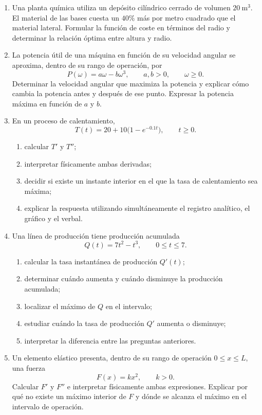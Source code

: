 \begin{enumerate}[label=\textbf{\arabic*.},leftmargin=*]
\item Una planta química utiliza un depósito cilíndrico cerrado de volumen $20\ \mathrm{m}^3$. El material de las bases cuesta un $40\%$ más por metro cuadrado que el material lateral. Formular la función de coste en términos del radio y determinar la relación óptima entre altura y radio.

\item La potencia útil de una máquina en función de su velocidad angular se aproxima, dentro de su rango de operación, por
\[
P(\omega)=a\omega-b\omega^3,
\qquad a,b>0,
\qquad \omega\geq0.
\]
Determinar la velocidad angular que maximiza la potencia y explicar cómo cambia la potencia antes y después de ese punto. Expresar la potencia máxima en función de $a$ y $b$.

\item En un proceso de calentamiento,
\[
T(t)=20+10\bigl(1-e^{-0.1t}\bigr),
\qquad t\geq0.
\]
\begin{enumerate}[label=\alph*)]
\item calcular $T'$ y $T''$;
\item interpretar físicamente ambas derivadas;
\item decidir si existe un instante interior en el que la tasa de calentamiento sea máxima;
\item explicar la respuesta utilizando simultáneamente el registro analítico, el gráfico y el verbal.
\end{enumerate}

\item Una línea de producción tiene producción acumulada
\[
Q(t)=7t^2-t^3,
\qquad 0\leq t\leq7.
\]
\begin{enumerate}[label=\alph*)]
\item calcular la tasa instantánea de producción $Q'(t)$;
\item determinar cuándo aumenta y cuándo disminuye la producción acumulada;
\item localizar el máximo de $Q$ en el intervalo;
\item estudiar cuándo la tasa de producción $Q'$ aumenta o disminuye;
\item interpretar la diferencia entre las preguntas anteriores.
\end{enumerate}

\item Un elemento elástico presenta, dentro de su rango de operación $0\leq x\leq L$, una fuerza
\[
F(x)=kx^2,
\qquad k>0.
\]
Calcular $F'$ y $F''$ e interpretar físicamente ambas expresiones. Explicar por qué no existe un máximo interior de $F$ y dónde se alcanza el máximo en el intervalo de operación.


\end{enumerate}
